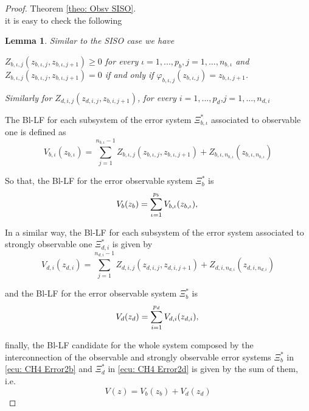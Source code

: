 \documentclass[11pt,letterpaper,twoside,openright]{report}
\newtheorem{lemma}{Lemma}[chapter]
\begin{document}
\begin{proof}{Theorem \ref{theo: Obsv SISO}. \\}
	it is easy to check the following 
	\begin{lemma}
		Similar to the SISO case we have
		
		\cite{Moreno2021} $Z_{b,\iota,j}(z_{b,\iota,j},z_{b,\iota,j+1}) \geq 0$ for every $\iota=1,...,p_b, j=1,...,n_{b,\iota}$ and $Z_{b,\iota,j}(z_{b,\iota,j},z_{b,\iota,j+1}) = 0$ if and only if $\varphi_{b,\iota,j}(z_{b,\iota,j})=z_{b,\iota,j+1}$.
		
		Similarly for $Z_{d,i,j}(z_{d,i,j},z_{b,i,j+1})$, for every $i=1,...,p_d$,$j=1,...,n_{d,i}$
	\end{lemma}
	
	\newpage 
	The Bl-LF for each subsystem of the error system $\Xi^*_{b,\iota}$ associated to observable one is defined as
	\begin{equation}\label{ecu: CH4 Vb_iota}
			V_{b,\iota}(z_{b,\iota}) = \sum_{j=1}^{n_{b,\iota}-1} Z_{b,\iota,j}(z_{b,\iota,j},z_{b,\iota,j+1})+Z_{b,\iota,n_{b,\iota}}(z_{b,\iota,n_{b,\iota}})
	\end{equation}

	So that, the Bl-LF for the error observable system $\Xi^*_{b}$ is
	\begin{equation}\label{ecu: CH4 Vb}
				V_b(z_b) = \sum_{\iota=1}^{p_b} V_{b,\iota}(z_{b,\iota}), \\
	\end{equation}
	
	In a similar way, the Bl-LF for each subsystem of the error system associated to strongly observable one $\Xi^*_{d,i}$ is given by 
	\begin{equation}\label{ecu: CH4 Vd_i}
		V_{d,i}(z_{d,i}) = \sum_{j=1}^{n_{d,i}-1} Z_{d,i,j}(z_{d,i,j},z_{d,i,j+1})+Z_{d,i,n_{d,i}}(z_{d,i,n_{d,i}})
	\end{equation}

	and the Bl-LF for the error observable system $\Xi^*_{b}$ is
	\begin{equation}\label{ecu: CH4 Vd}
		V_d(z_d) = \sum_{i=1}^{p_d} V_{d,i}(z_{d,i}), \\
	\end{equation}

	finally, the Bl-LF candidate for the whole system composed by the interconnection of the observable and strongly observable error systems $\Xi^*_{b}$ in \eqref{ecu: CH4 Error2b} and $\Xi^*_{d}$ in \eqref{ecu: CH4 Error2d} is given by the sum of them, i.e.
	\begin{equation}\label{ecu: CH4 V}
		V(z) = V_b(z_b)+V_d(z_d)
	\end{equation}
	


\end{proof}
\end{document}
